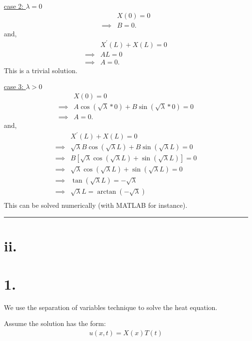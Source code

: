 \documentclass{article}
\begin{document}
\underline{case 2: $\lambda = 0$}
\begin{align*}
  &X(0) = 0 \\
  \implies& B = 0.
\end{align*}
and,
\begin{align*}
  &X^{\prime}(L) + X(L) = 0 \\
  \implies& AL = 0 \\
  \implies& A = 0.
\end{align*}
This is a trivial solution.
\newline

\underline{case 3: $\lambda > 0$}
\begin{align*}
  &X(0) = 0 \\
  \implies& A \cos(\sqrt{\lambda} * 0) + 
  B \sin(\sqrt{\lambda} * 0) = 0 \\
  \implies& A = 0.
\end{align*}
and,
\begin{align*}
  &X^{\prime}(L) + X(L) = 0 \\
  \implies& \sqrt{\lambda} B\cos(\sqrt{\lambda} L) 
  + B \sin(\sqrt{\lambda} L) = 0 \\
  \implies& B [\sqrt{\lambda} \cos(\sqrt{\lambda} L) 
  + \sin(\sqrt{\lambda} L)] = 0 \\
  \implies& \sqrt{\lambda} \cos(\sqrt{\lambda} L) 
  + \sin(\sqrt{\lambda} L) = 0 \\
  \implies& \tan(\sqrt{\lambda} L) = - \sqrt{\lambda} \\
  \implies& \sqrt{\lambda} L = \arctan(- \sqrt{\lambda}) \\
\end{align*}
This can be solved numerically (with MATLAB for instance).

\noindent\rule{\textwidth}{1pt}
\newpage

\section*{ii.}
\section*{1.}
We use the separation of variables technique to solve the heat equation.
\newline

\noindent
Assume the solution has the form:
\begin{align*}
  u(x,t) = X(x)T(t)
\end{align*}
\end{document}
